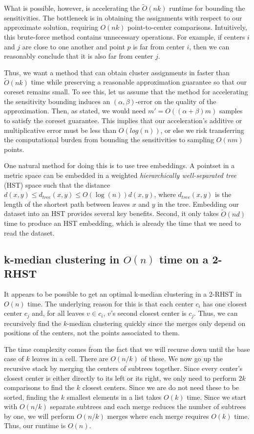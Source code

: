 \documentclass{article}
\theoremstyle{definition}
\begin{document}
What is possible, however, is accelerating the $\tilde{O}(nk)$ runtime for bounding the sensitivities. The bottleneck is in obtaining the assignments with
respect to our approximate solution, requiring $O(nk)$ point-to-center comparisons. Intuitively, this brute-force method contains unnecessary operations. For
example, if centers $i$ and $j$ are close to one another and point $p$ is far from center $i$, then we can reasonably conclude that it is also far from center
$j$.

Thus, we want a method that can obtain cluster assignments in faster than $\tilde{O}(nk)$ time while preserving a reasonable approximation guarantee so that our
coreset remains small. To see this, let us assume that the method for accelerating the sensitivity bounding induces an $(\alpha, \beta)$-error on the quality of
the approximation. Then, as stated, we would need $m' = O( (\alpha + \beta) m)$ samples to satisfy the coreset guarantee. This implies that our acceleration's
additive or multiplicative error must be less than $O(log(n))$, or else we risk transferring the computational burden from bounding the sensitivities to sampling
$O(nm)$ points.

One natural method for doing this is to use tree embeddings. A pointset in a metric space can be embedded in a weighted \emph{hierarchically well-separated
tree} (HST) space such that the distance $d(x, y) \leq d_{tree}(x, y) \leq O(\log(n))d(x, y)$, where $d_{tree}(x, y)$ is the length of the shortest path between
leaves $x$ and $y$ in the tree. Embedding our dataset into an HST provides several key benefits.  Second, it only takes $\tilde{O}(nd)$ time to produce an HST
embedding, which is already the time that we need to read the dataset.

\subsection{k-median clustering in $O(n)$ time on a 2-RHST}

It appears to be possible to get an optimal k-median clustering in a 2-RHST in $O(n)$ time. The underlying reason for this is that each center $c_i$
has one closest center $c_j$ and, for all leaves $v \in c_i$, $v$'s second closest center is $c_j$. Thus, we can recursively find the $k$-median clustering
quickly since the merges only depend on positions of the centers, not the points associated to them.

The time complexity comes from the fact that we will recurse down until the base case of $k$ leaves in a cell. There are $O(n/k)$ of these. We now go up the
recursive stack by merging the centers of subtrees together. Since every center's closest center is either directly to its left or its right, we only need to
perform $2k$ comparisons to find the $k$ closest centers. Since we are do not need these to be sorted, finding the $k$ smallest elements in a list takes $O(k)$
time. Since we start with $O(n/k)$ separate subtrees and each merge reduces the number of subtrees by one, we will perform $O(n/k)$ merges where each merge
requires $O(k)$ time. Thus, our runtime is $O(n)$.
\end{document}
